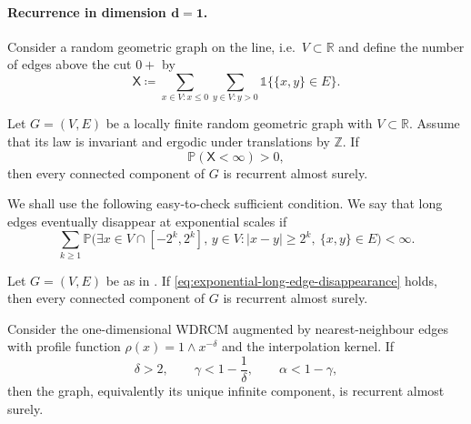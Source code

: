 \documentclass[11pt,a4paper]{scrartcl}
\renewcommand{\P}{\mathbb{P}}
\newcommand{\Z}{\mathbb{Z}}
\newcommand{\R}{\mathbb{R}}
\newcommand{\1}{\mathbb{1}}
\begin{document}
\paragraph{Recurrence in dimension \(\boldsymbol{d=1}\). }
Consider a random geometric graph on the line, i.e.\ \(V\subset\R\) and define the number
of edges above the cut \(0+\) by
\[
  \mathsf X
  \coloneqq 
  \sum_{x\in V:x\le 0}
  \sum_{y\in V:y>0}
  \1\{\{x,y\}\in E\}.
\]

\begin{theorem}
\label{thm:one-dimensional-criterion}
Let \(G=(V,E)\) be a locally finite random geometric graph with
\(V\subset\R\).  Assume that
its law is invariant and ergodic under translations by \(\Z\).  If
\[
  \P(\mathsf X<\infty)>0,
\]
then every connected component of \(G\) is recurrent almost surely.
\end{theorem}

We shall use the following easy-to-check sufficient condition.  We say that
long edges eventually disappear at exponential scales if
\begin{equation}
\label{eq:exponential-long-edge-disappearance}
  \sum_{k\ge 1}
  \P\big(
    \exists x\in V\cap[-2^k,2^k],\,y\in V:
    |x-y|\ge 2^k,\ \{x,y\}\in E
  \big)<\infty.
\end{equation}

\begin{corollary}
\label{cor:one-dimensional-long-edges}
Let \(G=(V,E)\) be as in .  If
\eqref{eq:exponential-long-edge-disappearance} holds, then every connected
component of \(G\) is recurrent almost surely.
\end{corollary}

\begin{corollary}
\label{cor:one-dimensional-wdrcm}
Consider the one-dimensional WDRCM augmented by nearest-neighbour edges with profile function \(\rho(x)=1\wedge x^{-\delta}\) and the interpolation kernel. If 
\[
  \delta>2,\qquad
  \gamma<1-\frac1\delta,\qquad
  \alpha<1-\gamma,
\]
%
%
then the graph, equivalently its unique infinite component, is recurrent
almost surely.
\end{corollary}
\end{document}
